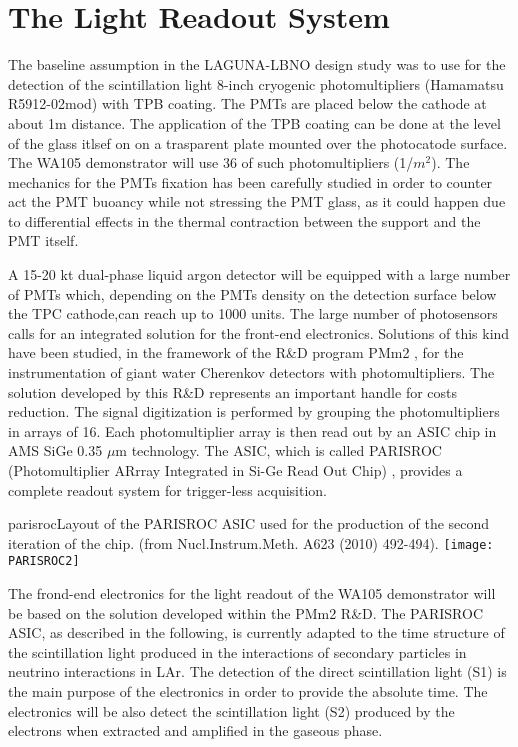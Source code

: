 \section{The Light Readout System} 
\label{sec:detectors-fd-alt-light}

The baseline assumption in the LAGUNA-LBNO design study was to use for the detection of the scintillation light 8-inch cryogenic photomultipliers (Hamamatsu R5912-02mod) with TPB coating. The PMTs are placed below the cathode at about 1m distance.  The application of the TPB coating can be done at the level of the glass itlsef on on a trasparent plate mounted over the photocatode surface.
The WA105 demonstrator will use 36 of such photomultipliers (1/$m^2$). The mechanics for the PMTs fixation has been carefully studied in order to counter act the PMT buoancy while not stressing the PMT glass, as it could happen due to  differential effects  in the thermal contraction between the support and the PMT itself.

A 15-20 kt dual-phase liquid argon detector will be equipped with a large number of PMTs which, depending on the PMTs density on the detection surface below the TPC cathode,can reach up to 1000 units. The large number of photosensors calls for an integrated solution for the front-end electronics. Solutions of this kind have been studied, in the framework of the R\&D program PMm2 \cite{PMM2-1, PMM2-2}, for the instrumentation of giant water Cherenkov detectors with photomultipliers. The solution developed by this R\&D represents an important handle for costs reduction. The signal digitization is performed by grouping the photomultipliers in arrays of 16. Each photomultiplier array is then read out by an ASIC chip in AMS SiGe 0.35 $\mu$m technology. The ASIC,
which is called PARISROC (Photomultiplier ARrray Integrated in Si-Ge Read Out Chip)  \cite{Parisroc}, provides a complete readout system for trigger-less acquisition.

\begin{cdrfigure}{parisroc}{Layout of the PARISROC ASIC used for the production of the second iteration of the
chip. (from Nucl.Instrum.Meth. A623 (2010) 492-494).}
 \texttt{[image: PARISROC2]}  
\end{cdrfigure}

The frond-end electronics for the light readout of the WA105 demonstrator will be based on the solution developed within the PMm2 R\&D. The PARISROC ASIC, as described in the following, is currently adapted to the  time structure of the scintillation light produced in the interactions of secondary particles in neutrino interactions in LAr. The detection of the direct scintillation light (S1) is the main purpose of the electronics in order to provide the absolute time.
The electronics will be also detect the scintillation light (S2) produced by the electrons when extracted and amplified in the gaseous phase.

